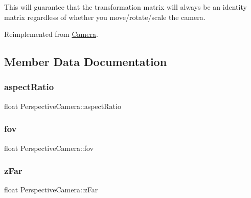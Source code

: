 This will guarantee that the transformation matrix will always be an identity matrix regardless of whether you move/rotate/scale the camera.

Reimplemented from \hyperlink{class_camera_aea640c892a3807671d8ca49616d96eda}{Camera}.



\subsection{Member Data Documentation}
\hypertarget{class_perspective_camera_ad96660d3109e54fa282955bf66a255eb}{}\label{class_perspective_camera_ad96660d3109e54fa282955bf66a255eb}
\subsubsection{\texorpdfstring{aspect\+Ratio}{aspectRatio}}
{\footnotesize\ttfamily float Perspective\+Camera\+::aspect\+Ratio\hspace{0.3cm}{\ttfamily [private]}}

\hypertarget{class_perspective_camera_ad693187f75ab5bfc597066364483325c}{}\label{class_perspective_camera_ad693187f75ab5bfc597066364483325c}
\subsubsection{\texorpdfstring{fov}{fov}}
{\footnotesize\ttfamily float Perspective\+Camera\+::fov\hspace{0.3cm}{\ttfamily [private]}}

\hypertarget{class_perspective_camera_af88e6161cd3c818d49e6421f52474a2b}{}\label{class_perspective_camera_af88e6161cd3c818d49e6421f52474a2b}
\subsubsection{\texorpdfstring{z\+Far}{zFar}}
{\footnotesize\ttfamily float Perspective\+Camera\+::z\+Far\hspace{0.3cm}{\ttfamily [private]}}

\hypertarget{class_perspective_camera_a11c1dcd1bdeb4bf8294d6272fb4d2695}{}\label{class_perspective_camera_a11c1dcd1bdeb4bf8294d6272fb4d2695}
